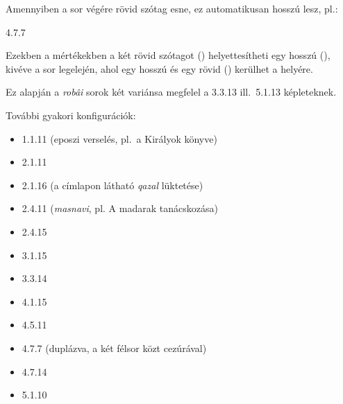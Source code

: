 Amennyiben a sor végére rövid szótag esne, ez automatikusan hosszú
lesz, pl.:
\begin{center}
4{.}7{.}7 \metra{\m\m\b\m\b\m\m}
\end{center}

Ezekben a mértékekben a két rövid szótagot (\metra{\b\b})
helyettesítheti egy hosszú (\metra{\m}), kivéve a sor legelején, ahol
egy hosszú és egy rövid (\metra{\m\b}) kerülhet a helyére.

Ez alapján a \emph{robâi} sorok két variánsa megfelel a 3{.}3{.}13
ill.~5{.}1{.}13 képleteknek.

További gyakori konfigurációk:
\begin{itemize}
  \item 1{.}1{.}11 (eposzi verselés, pl.~a Királyok könyve)
  \item 2{.}1{.}11
  \item 2{.}1{.}16 (a címlapon látható \emph{qazal} lüktetése)
  \item 2{.}4{.}11 (\emph{masnavi}, pl. A madarak tanácskozása)
  \item 2{.}4{.}15
  \item 3{.}1{.}15
  \item 3{.}3{.}14
  \item 4{.}1{.}15
  \item 4{.}5{.}11
  \item 4{.}7{.}7 (duplázva, a két félsor közt cezúrával)
  \item 4{.}7{.}14
  \item 5{.}1{.}10
\end{itemize}

